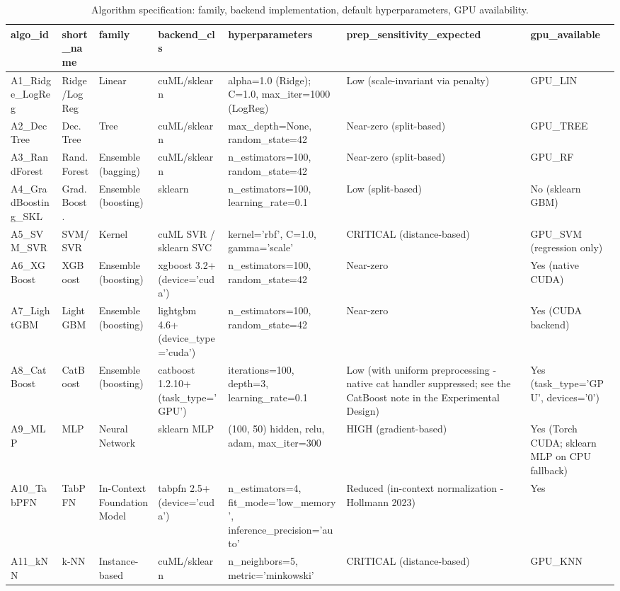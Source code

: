 \begin{table}
\caption{Algorithm specification: family, backend implementation, default hyperparameters, GPU availability.}
\label{tab:algorithms}
\begin{tabular}{lllllll}
\toprule
algo\_id & short\_name & family & backend\_cls & hyperparameters & prep\_sensitivity\_expected & gpu\_available \\
\midrule
A1\_Ridge\_LogReg & Ridge/LogReg & Linear & cuML/sklearn & alpha=1.0 (Ridge); C=1.0, max\_iter=1000 (LogReg) & Low (scale-invariant via penalty) & GPU\_LIN \\
A2\_DecTree & Dec. Tree & Tree & cuML/sklearn & max\_depth=None, random\_state=42 & Near-zero (split-based) & GPU\_TREE \\
A3\_RandForest & Rand. Forest & Ensemble (bagging) & cuML/sklearn & n\_estimators=100, random\_state=42 & Near-zero (split-based) & GPU\_RF \\
A4\_GradBoosting\_SKL & Grad. Boost. & Ensemble (boosting) & sklearn & n\_estimators=100, learning\_rate=0.1 & Low (split-based) & No (sklearn GBM) \\
A5\_SVM\_SVR & SVM/SVR & Kernel & cuML SVR / sklearn SVC & kernel='rbf', C=1.0, gamma='scale' & CRITICAL (distance-based) & GPU\_SVM (regression only) \\
A6\_XGBoost & XGBoost & Ensemble (boosting) & xgboost 3.2+ (device='cuda') & n\_estimators=100, random\_state=42 & Near-zero & Yes (native CUDA) \\
A7\_LightGBM & LightGBM & Ensemble (boosting) & lightgbm 4.6+ (device\_type='cuda') & n\_estimators=100, random\_state=42 & Near-zero & Yes (CUDA backend) \\
A8\_CatBoost & CatBoost & Ensemble (boosting) & catboost 1.2.10+ (task\_type='GPU') & iterations=100, depth=3, learning\_rate=0.1 & Low (with uniform preprocessing - native cat handler suppressed; see the CatBoost note in the Experimental Design) & Yes (task\_type='GPU', devices='0') \\
A9\_MLP & MLP & Neural Network & sklearn MLP & (100, 50) hidden, relu, adam, max\_iter=300 & HIGH (gradient-based) & Yes (Torch CUDA; sklearn MLP on CPU fallback) \\
A10\_TabPFN & TabPFN & In-Context Foundation Model & tabpfn 2.5+ (device='cuda') & n\_estimators=4, fit\_mode='low\_memory', inference\_precision='auto' & Reduced (in-context normalization - Hollmann 2023) & Yes \\
A11\_kNN & k-NN & Instance-based & cuML/sklearn & n\_neighbors=5, metric='minkowski' & CRITICAL (distance-based) & GPU\_KNN \\
\bottomrule
\end{tabular}
\end{table}

